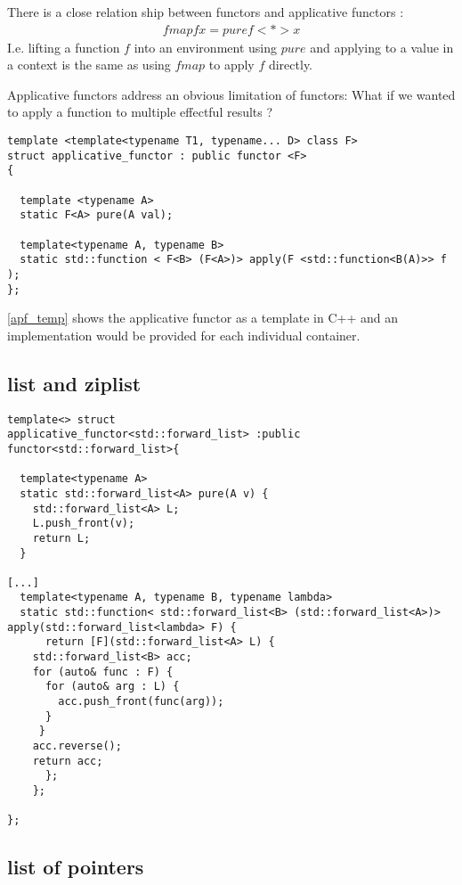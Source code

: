 \documentclass[12pt,fleqn]{article}
\begin{document}
There is a close relation ship between functors and applicative functors :
\begin{eqnarray*}
  fmap f x = pure f <*> x
\end{eqnarray*} 
I.e. lifting a function $f$ into an environment using $pure$ and applying to a value in a context is the same as using $fmap$ to apply $f$ directly.

Applicative functors address an obvious limitation of functors: What if we wanted to apply a function to multiple effectful results ?

\begin{lstlisting}[caption=applicative functor template in C++, label=apf_temp]
template <template<typename T1, typename... D> class F> 
struct applicative_functor : public functor <F>
{

  template <typename A> 
  static F<A> pure(A val);

  template<typename A, typename B>
  static std::function < F<B> (F<A>)> apply(F <std::function<B(A)>> f );
};
\end{lstlisting}

\ref{apf_temp} shows the applicative functor as a template in C++ and an implementation would be provided for each individual container.

\subsection*{list and ziplist}

\begin{lstlisting}[caption=std::forward\_list is an applicative functor, label=fwd_list_functor]
template<> struct 
applicative_functor<std::forward_list> :public functor<std::forward_list>{

  template<typename A>
  static std::forward_list<A> pure(A v) {
    std::forward_list<A> L;
    L.push_front(v);
    return L;
  }
  
[...]
  template<typename A, typename B, typename lambda>
  static std::function< std::forward_list<B> (std::forward_list<A>)> apply(std::forward_list<lambda> F) {
      return [F](std::forward_list<A> L) {
	std::forward_list<B> acc;
	for (auto& func : F) {
	  for (auto& arg : L) {
	    acc.push_front(func(arg));
	  }
	 } 
	acc.reverse();
	return acc;
      };
    };

};

\end{lstlisting}

\subsection*{list of pointers}
\end{document}
